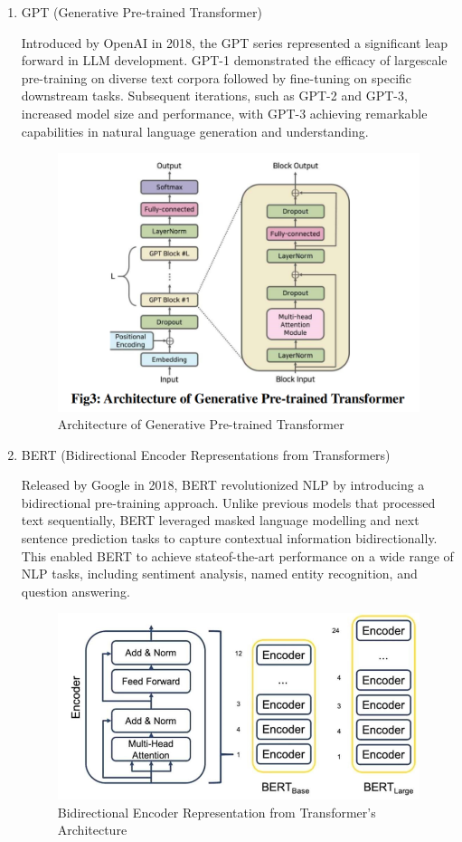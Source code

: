 \begin{enumerate}
    \item GPT (Generative Pre-trained Transformer)

Introduced by OpenAI in 2018, the GPT series represented a significant leap forward in LLM development. GPT-1 demonstrated the efficacy of largescale pre-training on diverse text corpora followed by fine-tuning on specific downstream tasks. Subsequent iterations, such as GPT-2 and GPT-3, increased model size and performance, with GPT-3 achieving remarkable capabilities in natural language generation and understanding.

\begin{figure}[h]
    \centering
    \includegraphics[width=0.8\linewidth]{img/chap04/gptstructure.png}
    \caption{Architecture of Generative Pre-trained Transformer}
    \label{fig:gptarch}
\end{figure}

    \item BERT (Bidirectional Encoder Representations from Transformers)

Released by Google in 2018, BERT revolutionized NLP by introducing a bidirectional pre-training approach. Unlike previous models that processed text sequentially, BERT leveraged masked language modelling and next sentence prediction tasks to capture contextual information bidirectionally. This enabled BERT to achieve stateof-the-art performance on a wide range of NLP tasks, including sentiment analysis, named entity recognition, and question answering.

\begin{figure}[h]
    \centering
    \includegraphics[width=0.8\linewidth]{img/chap04/bertarch.png}
    \caption{Bidirectional Encoder Representation from Transformer's Architecture}
    \label{bertarch}
\end{figure}


\end{enumerate}
